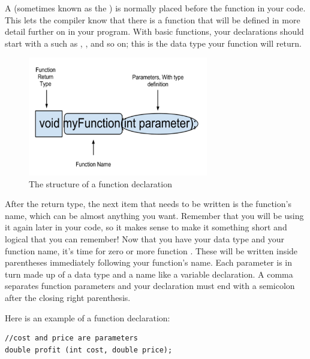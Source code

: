 A  (sometimes known as the ) is normally placed before the  function in your code. 
This lets the compiler know that there is a function that will be defined in more detail further on in your program. 
With basic functions, your declarations should start with a  such as , , and so on; this is the data type your function will return. 

\begin{figure}[tb]
  \centering
  \includegraphics[width=0.7\textwidth]{diagrams/function_structure_diagram_1.pdf}
  \caption{The structure of a function declaration} \label{fig:function_structure_diagram_1} 
\end{figure}

After the return type, the next item that needs to be written is the function's name, which can be almost anything you want. 
Remember that you will be using it again later in your code, so it makes sense to make it something short and logical that you can remember! 
Now that you have your data type and your function name, it's time for zero or more function . 
These will be written inside parentheses immediately following your function's name. 
Each parameter is in turn made up of a data type and a name like a variable declaration. 
A comma separates function parameters and your declaration must end with a semicolon after the closing right parenthesis.

\noindent Here is an example of a function declaration:

\noindent\begin{minipage}{\linewidth}\begin{lstlisting}
//cost and price are parameters
double profit (int cost, double price); 
\end{lstlisting}\end{minipage}
        	
